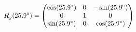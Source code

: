 \documentclass[preview]{standalone}
\begin{document}
\begin{align*}
\special{dvisvgm:raw <g id='unique000'>}R_y(25.9^\circ) = \begin{pmatrix} \cos(25.9^\circ) & 0 & -\sin(25.9^\circ) \\ 0 & 1 & 0 \\ \sin(25.9^\circ) & 0 & \cos(25.9^\circ) \end{pmatrix}\special{dvisvgm:raw </g>}
\end{align*}
\end{document}
